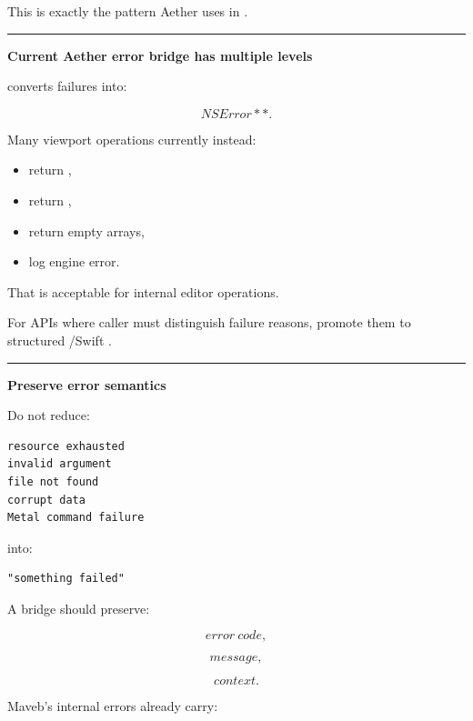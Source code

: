 This is exactly the pattern Aether uses in .

\begin{center}\rule{0.5\linewidth}{0.5pt}\end{center}

\textbf{Current Aether error bridge has multiple levels}

 converts failures into:

\[
NSError**.
\]

Many viewport operations currently instead:

\begin{itemize}
\tightlist
\item
  return ,
\item
  return ,
\item
  return empty arrays,
\item
  log engine error.
\end{itemize}

That is acceptable for internal editor operations.

For APIs where caller must distinguish failure reasons, promote them to structured /Swift .

\begin{center}\rule{0.5\linewidth}{0.5pt}\end{center}

\textbf{Preserve error semantics}

Do not reduce:

\begin{verbatim}
resource exhausted
invalid argument
file not found
corrupt data
Metal command failure
\end{verbatim}

into:

\begin{verbatim}
"something failed"
\end{verbatim}

A bridge should preserve:

\[
error\ code,
\]

\[
message,
\]

\[
context.
\]

Maveb's internal errors already carry:

